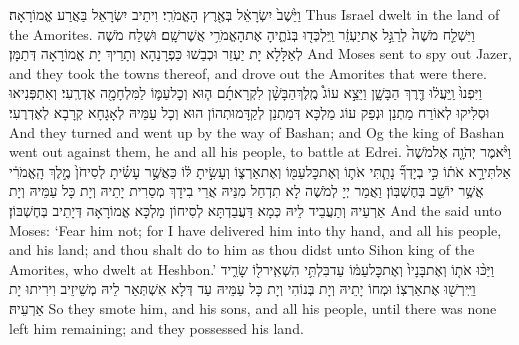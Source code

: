 {וַיֵּ֙שֶׁב֙ יִשְׂרָאֵ֔ל בְּאֶ֖רֶץ הָאֱמֹרִֽי׃}
{וִיתֵיב יִשְׂרָאֵל בַּאֲרַע אֱמוֹרָאָה׃}
{Thus Israel dwelt in the land of the Amorites.}{}
{וַיִּשְׁלַ֤ח מֹשֶׁה֙ לְרַגֵּ֣ל אֶת\maqqaf יַעְזֵ֔ר וַֽיִּלְכְּד֖וּ בְּנֹתֶ֑יהָ  אֶת\maqqaf הָאֱמֹרִ֥י אֲשֶׁר\maqqaf שָֽׁם׃}
{וּשְׁלַח מֹשֶׁה לְאַלָּלָא יָת יַעְזֵר וּכְבַשׁוּ כַּפְרָנַהָא וְתָרֵיךְ יָת אֱמוֹרָאָה דְּתַמָּן׃}
{And Moses sent to spy out Jazer, and they took the towns thereof, and drove out the Amorites that were there.}{}
{וַיִּפְנוּ֙ וַֽיַּעֲל֔וּ דֶּ֖רֶךְ הַבָּשָׁ֑ן וַיֵּצֵ֣א עוֹג֩ מֶֽלֶךְ\maqqaf הַבָּשָׁ֨ן לִקְרָאתָ֜ם ה֧וּא וְכׇל\maqqaf עַמּ֛וֹ לַמִּלְחָמָ֖ה אֶדְרֶֽעִי׃}
{וְאִתְפְּנִיאוּ וּסְלִיקוּ לְאוֹרַח מַתְנַן וּנְפַק עוֹג מַלְכָּא דְּמַתְנַן לְקַדָּמוּתְהוֹן הוּא וְכָל עַמֵּיהּ לְאָגָחָא קְרָבָא לְאֶדְרֶעִי׃}
{And they turned and went up by the way of Bashan; and Og the king of Bashan went out against them, he and all his people, to battle at Edrei.}{}
{וַיֹּ֨אמֶר יְהֹוָ֤ה אֶל\maqqaf מֹשֶׁה֙ אַל\maqqaf תִּירָ֣א אֹת֔וֹ כִּ֣י בְיָדְךָ֞ נָתַ֧תִּי אֹת֛וֹ וְאֶת\maqqaf כׇּל\maqqaf עַמּ֖וֹ וְאֶת\maqqaf אַרְצ֑וֹ וְעָשִׂ֣יתָ לּ֔וֹ כַּאֲשֶׁ֣ר עָשִׂ֗יתָ לְסִיחֹן֙ מֶ֣לֶךְ הָֽאֱמֹרִ֔י אֲשֶׁ֥ר יוֹשֵׁ֖ב בְּחֶשְׁבּֽוֹן׃}
{וַאֲמַר יְיָ לְמֹשֶׁה לָא תִדְחַל מִנֵּיהּ אֲרֵי בִידָךְ מְסַרִית יָתֵיהּ וְיָת כָּל עַמֵּיהּ וְיָת אַרְעֵיהּ וְתַעֲבֵיד לֵיהּ כְּמָא דַּעֲבַדְתָּא לְסִיחוֹן מַלְכָּא אֱמוֹרָאָה דְּיָתֵיב בְּחֶשְׁבּוֹן׃}
{And the \lord\space said unto Moses: ‘Fear him not; for I have delivered him into thy hand, and all his people, and his land; and thou shalt do to him as thou didst unto Sihon king of the Amorites, who dwelt at Heshbon.’}{}
{וַיַּכּ֨וּ אֹת֤וֹ וְאֶת\maqqaf בָּנָיו֙ וְאֶת\maqqaf כׇּל\maqqaf עַמּ֔וֹ עַד\maqqaf בִּלְתִּ֥י הִשְׁאִֽיר\maqqaf ל֖וֹ שָׂרִ֑יד וַיִּֽירְשׁ֖וּ אֶת\maqqaf אַרְצֽוֹ׃}
{וּמְחוֹ יָתֵיהּ וְיָת בְּנוֹהִי וְיָת כָּל עַמֵּיהּ עַד דְּלָא אִשְׁתְּאַר לֵיהּ מְשֵׁיזֵיב וִירִיתוּ יָת אַרְעֵיהּ׃}
{So they smote him, and his sons, and all his people, until there was none left him remaining; and they possessed his land.}{}
